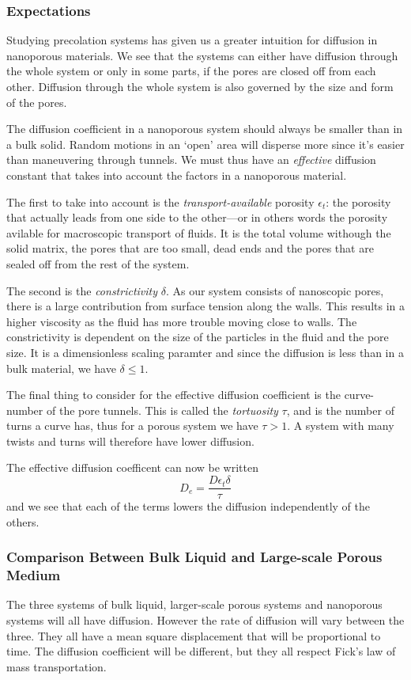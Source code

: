 \documentclass[11pt]{article}
\numberwithin{equation}{section}
\numberwithin{figure}{section}
\newcommand{\ita}[1]{\textit{#1}}
\begin{document}
\subsubsection{Expectations}
Studying precolation systems has given us a greater intuition
for diffusion in nanoporous materials.
We see that the systems can either have diffusion through
the whole system or only in some parts, if the
pores are closed off from each other.
Diffusion through the whole system is also governed by the size 
and form of the pores.

The diffusion coefficient in a nanoporous system should always
be smaller than in a bulk solid. Random motions in an
`open' area will disperse more since it's easier than
maneuvering through tunnels.
We must thus have an \ita{effective} diffusion constant
that takes into account the factors in a nanoporous material.

The first to take into account is the \ita{transport-available}
porosity $\epsilon_t$: the porosity that actually leads from one side to
the other---or in others words the porosity avilable for macroscopic transport
of fluids.
It is the total volume withough the solid matrix, the pores that are too
small, dead ends and the pores that are sealed off from the rest of the system.

The second is the \ita{constrictivity} $\delta$.
As our system consists of nanoscopic pores, there is a large contribution
from surface tension along the walls. This results in a higher viscosity
as the fluid has more trouble moving close to walls.
The constrictivity is dependent on the size of the particles in the fluid
and the pore size.
It is a dimensionless scaling paramter and since the diffusion is less
than in a bulk material, we have $\delta \leq 1$.

The final thing to consider for the effective diffusion coefficient is
the curve-number of the pore tunnels. 
This is called the \ita{tortuosity} $\tau$, and is the number of turns
a curve has, thus for a porous system we have $\tau > 1$.
A system with many twists and turns will therefore have lower diffusion.

The effective diffusion coefficent can now be written
\begin{equation}
    D_e = \frac{D\epsilon_t \delta}{\tau}
\end{equation}
and we see that each of the terms lowers the diffusion independently of
the others.

\subsubsection{Comparison Between Bulk Liquid and Large-scale Porous Medium}
The three systems of bulk liquid, larger-scale porous systems
and nanoporous systems will all have diffusion. However the rate of
diffusion will vary between the three. They all have a 
mean square displacement that will be proportional to time.
The diffusion coefficient will be different, but they all
respect Fick's law of mass transportation.
\end{document}
